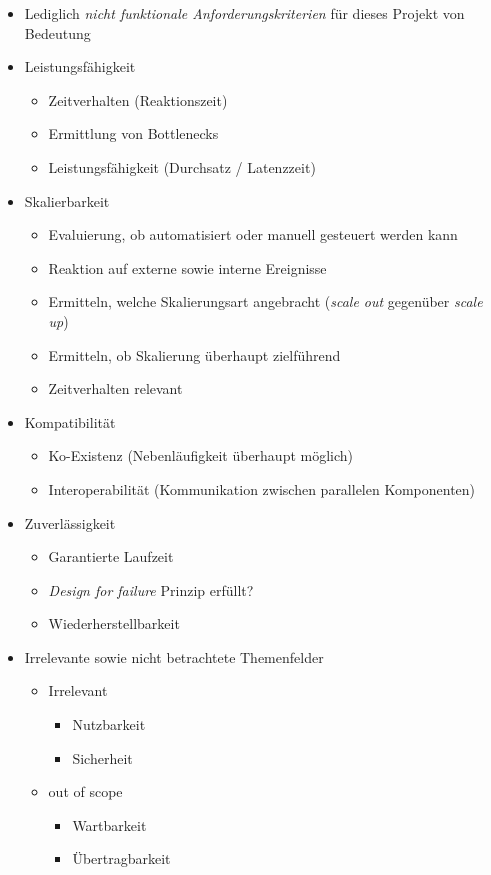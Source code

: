 \begin{itemize}
	\item Lediglich \emph{nicht funktionale Anforderungskriterien} für dieses Projekt von Bedeutung
	\item Leistungsfähigkeit
	\begin{itemize}
		\item Zeitverhalten (Reaktionszeit)
		\item Ermittlung von Bottlenecks
		\item Leistungsfähigkeit (Durchsatz / Latenzzeit)
	\end{itemize}
	\item Skalierbarkeit
	\begin{itemize}
		\item Evaluierung, ob automatisiert oder manuell gesteuert werden kann
		\item Reaktion auf externe sowie interne Ereignisse
		\item Ermitteln, welche Skalierungsart angebracht (\emph{scale out} gegenüber \emph{scale up})
		\item Ermitteln, ob Skalierung überhaupt zielführend
		\item Zeitverhalten relevant
	\end{itemize}
	\item Kompatibilität
	\begin{itemize}
		\item Ko-Existenz (Nebenläufigkeit überhaupt möglich)
		\item Interoperabilität (Kommunikation zwischen parallelen Komponenten)
	\end{itemize}
	\item Zuverlässigkeit
	\begin{itemize}
		\item Garantierte Laufzeit
		\item \emph{Design for failure} Prinzip erfüllt?
		\item Wiederherstellbarkeit
	\end{itemize}
	\item Irrelevante sowie nicht betrachtete Themenfelder
	\begin{itemize}
		\item Irrelevant
		\begin{itemize}
			\item Nutzbarkeit
			\item Sicherheit
		\end{itemize}
		\item out of scope
		\begin{itemize}
			\item Wartbarkeit
			\item Übertragbarkeit
		\end{itemize}
	\end{itemize}
\end{itemize}
